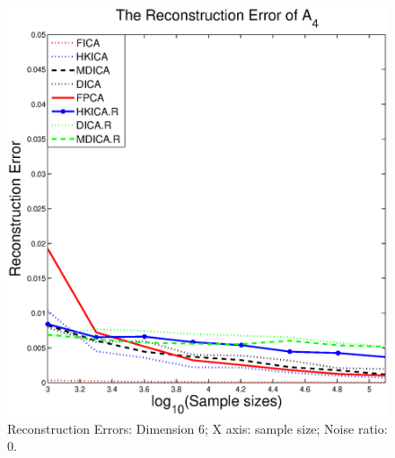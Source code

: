 \begin{figure}[t]
	\includegraphics[width =0.45\columnwidth]{images/error4_sample_noise0}
\caption{
\label{fig:Error_sample_noise0}
 Reconstruction Errors: Dimension 6; X axis: sample size; Noise ratio: 0.}
\end{figure}


